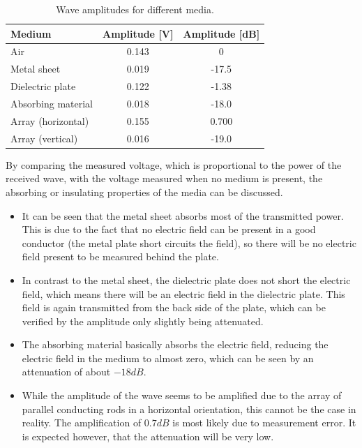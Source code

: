 \begin{table}[h]
\centering
\caption{Wave amplitudes for different media.}
\label{tab:Ass1_3}
\begin{tabular}{|l|c|c|}
\hline
Medium             & \multicolumn{1}{l|}{Amplitude {[}V{]}} & \multicolumn{1}{l|}{Amplitude {[}dB{]}} \\ \hline
Air                & 0.143                                  & 0                                       \\ \hline
Metal sheet        & 0.019                                  & -17.5                                   \\ \hline
Dielectric plate   & 0.122                                  & -1.38                                   \\ \hline
Absorbing material & 0.018                                  & -18.0                                   \\ \hline
Array (horizontal) & 0.155                                  & 0.700                                   \\ \hline
Array (vertical)   & 0.016                                  & -19.0                                   \\ \hline
\end{tabular}
\end{table}

By comparing the measured voltage, which is proportional to the power of the received wave, with the voltage measured when no medium is present, the absorbing or insulating properties of the media can be discussed.

\begin{itemize}
    \item It can be seen that the metal sheet absorbs most of the transmitted power. This is due to the fact that no electric field can be present in a good conductor (the metal plate short circuits the field), so there will be no electric field present to be measured behind the plate.
    
    \item In contrast to the metal sheet, the dielectric plate does not short the electric field, which means there will be an electric field in the dielectric plate. This field is again transmitted from the back side of the plate, which can be verified by the amplitude only slightly being attenuated.
    
    \item The absorbing material basically absorbs the electric field, reducing the electric field in the medium to almost zero, which can be seen by an attenuation of about $-18 dB$.
    
    \item While the amplitude of the wave seems to be amplified due to the array of parallel conducting rods in a horizontal orientation, this cannot be the case in reality. The amplification of $0.7dB$ is most likely due to measurement error. It is expected however, that the attenuation will be very low.
\end{itemize}